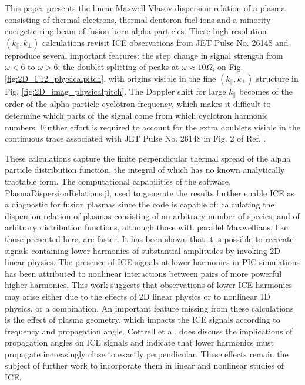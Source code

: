 \documentclass[12pt]{iopart}
\begin{document}
This paper presents the linear Maxwell-Vlasov dispersion relation of a plasma consisting of thermal electrons, thermal deuteron fuel ions and a minority energetic ring-beam of fusion born alpha-particles. These high resolution $(k_\parallel, k_\perp)$ calculations revisit ICE observations from JET Pulse No. 26148\cite{Cottrell1993,Dendy1995} and reproduce several important features: the step change in signal strength from $\omega < 6$ to $\omega > 6$; the doublet splitting of peaks at $\omega \approx 10\Omega_i$ on Fig. \ref{fig:2D_F12_physicalpitch}, with origins visible in the fine $(k_\parallel, k_\perp)$ structure in Fig. \ref{fig:2D_imag_physicalpitch}. The Doppler shift for large $k_\parallel$ becomes of the order of the alpha-particle cyclotron frequency, which makes it difficult to determine which parts of the signal come from which cyclotron harmonic numbers. Further effort is required to account for the extra doublets visible in the continuous trace associated with JET Pulse No. 26148 in Fig. 2 of Ref. \cite{Cottrell1993}.

These calculations capture the finite perpendicular thermal spread of the alpha particle distribution function, the integral of which has no known analytically tractable form. The computational capabilities of the software, PlasmaDispersionRelations.jl, used to generate the results further enable ICE as a diagnostic for fusion plasmas since the code is capable of: calculating the dispersion relation of plasmas consisting of an arbitrary number of species; and of arbitrary distribution functions, although those with parallel Maxwellians, like those presented here, are faster. It has been shown that it is possible to recreate signals containing lower harmonics of substantial amplitudes by invoking 2D linear physics. The presence of ICE signals at lower harmonics in PIC simulations has been attributed to nonlinear interactions between pairs of more powerful higher harmonics\cite{Carbajal2014}. This work suggests that observations of lower ICE harmonics may arise either due to the effects of 2D linear physics or to nonlinear 1D physics\cite{Chapman2018}, or a combination. An important feature missing from these calculations is the effect of plasma geometry, which impacts the ICE signals according to frequency and propagation angle. Cottrell et al. \cite{Cottrell1993} does discuss the implications of propagation angles on ICE signals and indicate that lower harmonics must propagate increasingly close to exactly perpendicular. These effects remain the subject of further work to incorporate them in linear and nonlinear studies of ICE.
\end{document}
